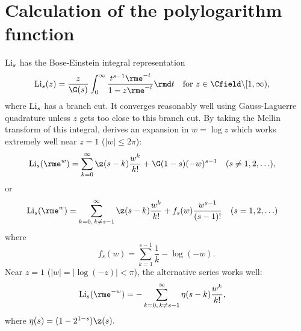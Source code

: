 \documentclass[a4paper,10pt]{article}
\begin{document}
\section{Calculation of the polylogarithm function}
${\rm Li}_{s}$ has the Bose-Einstein integral representation \citep{wood1992-polylog-techrep}
\begin{align}
{\rm Li}_{s}(z)
&=\frac{z}{\G(s)}\int_{0}^{\infty}\frac{t^{s-1}\rme^{-t}}{1-z\rme^{-t}}\rmd t
\quad\text{for }z\in\Cfield\backslash[1,\infty),
\end{align}
where ${\rm Li}_{s}$ has a branch cut. It converges reasonably well using Gauss-Laguerre quadrature unless $z$ gets too close to this branch cut. By taking the Mellin transform of this integral, \cite{wood1992-polylog-techrep} derives an expansion in $w=\log z$ which works extremely well near $z=1$ ($|w|\leq 2\pi$):
\begin{align}
{\rm Li}_{s}(\rme^{w})
&=\sum_{k=0}^{\infty}\z(s-k)\frac{w^{k}}{k!}+\G(1-s)(-w)^{s-1}
\quad\text{($s\neq1,2,\ldots$)},
\end{align}
or 
\begin{align}
{\rm Li}_{s}(\rme^{w})
&=\sum_{k=0,\,k\neq s-1}^{\infty}\z(s-k)\frac{w^{k}}{k!}+
f_{s}(w)\frac{w^{s-1}}{(s-1)!}
\quad\text{($s=1,2,\ldots$)}
\end{align}
where
\[f_{s}(w)=\sum_{k=1}^{s-1}\frac1k-\log(-w).\]
Near $z=1$ ($|w|=|\log(-z)|<\pi$), the alternative series works well:
\begin{align}
{\rm Li}_{s}(\rme^{-w})
&=-\sum_{k=0,\,k\neq s-1}^{\infty}\eta(s-k)\frac{w^{k}}{k!},
\end{align}
where $\eta(s)=(1-2^{1-s})\z(s).$



\end{document}

